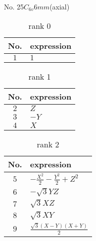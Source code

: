 \documentclass[fleqn,8pt,landscape]{jsarticle}
\begin{document}
\setcounter{MaxMatrixCols}{16}

\begin{center}
\LARGE
No. 25\quad$C_{6v}$\quad$6mm$\quad[ hexagonal ] (axial)
\end{center}
\begin{table}[ht!]
\begin{center}
\caption{rank 0}
\renewcommand{\arraystretch}{1.3}
\begin{tabular}{cl} \hline \hline
No. & expression \\ \hline
$ 1 $ & $ 1 $ \\
 \hline \hline
\end{tabular}
\end{center}
\end{table}
\begin{table}[ht!]
\begin{center}
\caption{rank 1}
\renewcommand{\arraystretch}{1.3}
\begin{tabular}{cl} \hline \hline
No. & expression \\ \hline
$ 2 $ & $ Z $ \\
$ 3 $ & $ - Y $ \\
$ 4 $ & $ X $ \\
 \hline \hline
\end{tabular}
\end{center}
\end{table}
\begin{table}[ht!]
\begin{center}
\caption{rank 2}
\renewcommand{\arraystretch}{1.3}
\begin{tabular}{cl} \hline \hline
No. & expression \\ \hline
$ 5 $ & $ - \frac{X^{2}}{2} - \frac{Y^{2}}{2} + Z^{2} $ \\
$ 6 $ & $ - \sqrt{3} Y Z $ \\
$ 7 $ & $ \sqrt{3} X Z $ \\
$ 8 $ & $ \sqrt{3} X Y $ \\
$ 9 $ & $ \frac{\sqrt{3} \left(X - Y\right) \left(X + Y\right)}{2} $ \\
 \hline \hline
\end{tabular}
\end{center}
\end{table}
\end{document}
